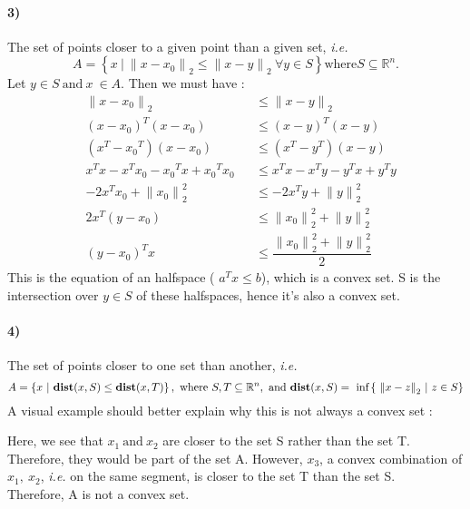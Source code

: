 \documentclass[12pt,a4paper]{article}
\begin{document}
\paragraph{3)} The set of points closer to a given point than a given set, \textit{i.e.} $$
	A = \left\lbrace x ~| ~{\| x - x_0 \|}_2 \leq {\|x-y\|}_2 ~\forall y \in S \right\rbrace \text{where} S \subseteq \mathbb{R}^n.
$$
Let  $ y \in S ~\text{and} ~x~\in A$. Then we must have :
\begin{align*}
&	{\| x- x_0 \|}_2 &&\leq {\| x-y\|}_2\\
			 &	(x-x_0)^T (x-x_0) &&\leq (x-y)^T(x-y) 			 \\
			 & (x^T - {x_0}^T )(x-x_0) &&\leq (x^T -y^T)(x-y)\\
			 & x^T x - x^T x_0 - {x_0}^Tx + {x_0}^T x_0 && \leq  x^Tx - x^Ty - y^Tx + y^Ty\\
			 & -2x^Tx_0 + {\|x_0\|}_2^2 &&\leq -2x^Ty + {\|y\|}_2^2\\
			 & 2x^T(y-x_0) &&\leq {\|x_0\|}_2^2 + {\|y\|}_2^2 \\
			 & (y-{x_0})^Tx &&\leq \dfrac{{\|x_0\|}_2^2 + {\|y\|}_2^2}{2}
\end{align*}
This is the equation of an halfspace ( $ a^T x \leq b $), which is a convex set. 
S is the intersection over $ y \in S $ of these halfspaces, hence it's also a convex set.
\paragraph{4)} The set of points closer to one set than another, \textit{i.e.} $$ A = \left\lbrace x ~| ~\text{\textbf{dist}}(x,S) \leq \text{\textbf{dist}}(x,T)\right\rbrace , \\ 
~\text{where} ~S,T \subseteq \mathbb{R}^n, ~\text{and} ~\text{\textbf{dist}}(x,S)=~\text{inf}\left\lbrace~{\|x-z\|}_2 ~| ~z \in S\right\rbrace$$
A visual example should better explain why this is not always a convex set :
\begin{center}
\end{center}
Here, we see that $ x_1 ~\text{and}~ x_2 $ are closer to the set S rather than the set T. Therefore, they would be part of the set A. 
However, $ x_3 $, a convex combination of $ x_1,~x_2 $, \textit{i.e.} on the same segment, is closer to the set T than the set S.\\
Therefore, A is not a convex set.
\end{document}
